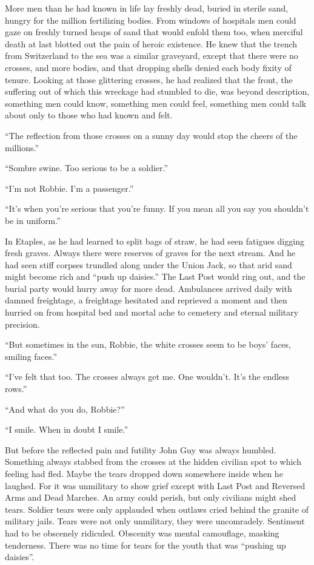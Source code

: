 More men than he had known in life lay freshly dead, buried in sterile sand, hungry 
for the million fertilizing bodies. From windows of hospitals men could gaze on freshly 
turned heaps of sand that would enfold them too, when merciful death at last blotted 
out the pain of heroic existence. He knew that the trench from Switzerland to the sea 
was a similar graveyard, except that there were no crosses, and more bodies, and that 
dropping shells denied each body fixity of tenure. Looking at those glittering crosses, 
he had realized that the front, the suffering out of which this wreckage had stumbled 
to die, was beyond description, something men could know, something men could feel, 
something men could talk about only to those who had known and felt.

``The reflection from those crosses on a sunny day would stop the cheers of the millions.''

``Sombre swine. Too serious to be a soldier.''

``I'm not Robbie. I'm a passenger.''

``It's when you're serious that you're funny. If you mean all you say you shouldn't 
be in uniform.''

In Etaples, as he had learned to split bags of straw, he had seen fatigues digging 
fresh graves. Always there were reserves of graves for the next stream. And he had seen 
stiff corpses trundled along under the Union Jack, so that arid sand might become rich 
and ``push up daisies.'' The Last Post would ring out, and the burial party would hurry 
away for more dead. Ambulances arrived daily with damned freightage, a freightage hesitated 
and reprieved a moment and then hurried on from hospital bed and mortal ache to cemetery and 
eternal military precision.

``But sometimes in the sun, Robbie, the white crosses seem to be boys' faces, smiling faces.''

``I've felt that too. The crosses always get me. One wouldn't. It's the endless rows.''

``And what do you do, Robbie?''

``I smile. When in doubt I smile.''

But before the reflected pain and futility John Guy was always humbled. Something always 
stabbed from the crosses at the hidden civilian spot to which feeling had fled. Maybe the 
tears dropped down somewhere inside when he laughed. For it was unmilitary to show grief 
except with Last Post and Reversed Arms and Dead Marches. An army could perish, but only 
civilians might shed tears. Soldier tears were only applauded when outlaws cried behind 
the granite of military jails. Tears were not only unmilitary, they were uncomradely. 
Sentiment had to be obscenely ridiculed. Obscenity was mental camouflage, masking tenderness. 
There was no time for tears for the youth that was ``pushing up daisies''.

